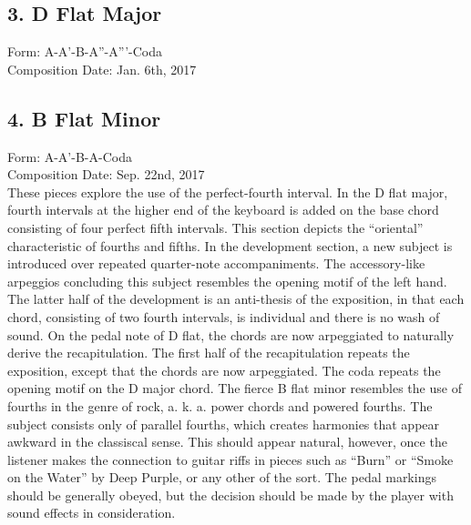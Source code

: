 \documentclass{jarticle}
\begin{document}


\subsection*{3. D Flat Major}
Form: A-A'-B-A''-A'''-Coda \\
Composition Date: Jan. 6th, 2017 \\

\subsection*{4. B Flat Minor}
Form: A-A'-B-A-Coda \\
Composition Date: Sep. 22nd, 2017 \\


These pieces explore the use of the perfect-fourth interval. In the D flat major, fourth intervals at the higher end of the keyboard is added on the base chord consisting of four perfect fifth intervals. This section depicts the ``oriental'' characteristic of fourths and fifths. In the development section, a new subject is introduced over repeated quarter-note accompaniments. The accessory-like arpeggios concluding this subject resembles the opening motif of the left hand. The latter half of the development is an anti-thesis of the exposition, in that each chord, consisting of two fourth intervals, is individual and there is no wash of sound. On the pedal note of D flat, the chords are now arpeggiated to naturally derive the recapitulation. The first half of the recapitulation repeats the exposition, except that the chords are now arpeggiated. The coda repeats the opening motif on the D major chord. The fierce B flat minor resembles the use of fourths in the genre of rock, a. k. a. power chords and powered fourths. The subject consists only of parallel fourths, which creates harmonies that appear awkward in the classiscal sense. This should appear natural, however, once the listener makes the connection to guitar riffs in pieces such as ``Burn'' or ``Smoke on the Water'' by Deep Purple, or any other of the sort. The pedal markings should be generally obeyed, but the decision should be made by the player with sound effects in consideration. \\
\end{document}

